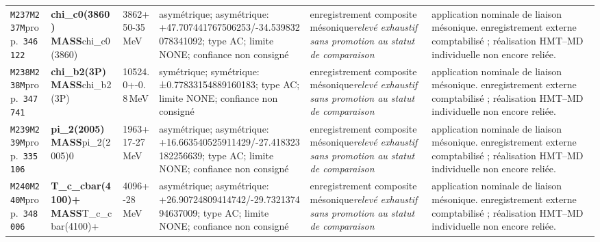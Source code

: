 \begin{landscape}
\begin{longtable}{L{1.85cm}L{4.45cm}L{2.35cm}L{4.05cm}L{3.35cm}L{7.15cm}}
\texttt{M237}\newline \texttt{M237M}\newline prop.\ \texttt{346122} & \textbf{chi\_\allowbreak{}c0(3860) MASS}\newline chi\_\allowbreak{}c0(3860) & 3862+50-35\,MeV & asymétrique; asymétrique: +47.707441767506253/-34.539832078341092; type AC; limite NONE; confiance non consigné & enregistrement composite mésonique\newline \emph{relevé exhaustif sans promotion au statut de comparaison} & application nominale de liaison mésonique. enregistrement externe comptabilisé ; réalisation HMT--MD individuelle non encore reliée. \\
\texttt{M238}\newline \texttt{M238M}\newline prop.\ \texttt{347741} & \textbf{chi\_\allowbreak{}b2(3P) MASS}\newline chi\_\allowbreak{}b2(3P) & 10524.0+-0.8\,MeV & symétrique; symétrique: ±0.77833154889160183; type AC; limite NONE; confiance non consigné & enregistrement composite mésonique\newline \emph{relevé exhaustif sans promotion au statut de comparaison} & application nominale de liaison mésonique. enregistrement externe comptabilisé ; réalisation HMT--MD individuelle non encore reliée. \\
\texttt{M239}\newline \texttt{M239M}\newline prop.\ \texttt{335106} & \textbf{pi\_\allowbreak{}2(2005) MASS}\newline pi\_\allowbreak{}2(2005)0 & 1963+17-27\,MeV & asymétrique; asymétrique: +16.663540525911429/-27.418323182256639; type AC; limite NONE; confiance non consigné & enregistrement composite mésonique\newline \emph{relevé exhaustif sans promotion au statut de comparaison} & application nominale de liaison mésonique. enregistrement externe comptabilisé ; réalisation HMT--MD individuelle non encore reliée. \\
\texttt{M240}\newline \texttt{M240M}\newline prop.\ \texttt{348006} & \textbf{T\_\allowbreak{}c\_\allowbreak{}cbar(4100)+ MASS}\newline T\_\allowbreak{}c\_\allowbreak{}cbar(4100)+ & 4096+-28\,MeV & asymétrique; asymétrique: +26.90724809414742/-29.732137494637009; type AC; limite NONE; confiance non consigné & enregistrement composite mésonique\newline \emph{relevé exhaustif sans promotion au statut de comparaison} & application nominale de liaison mésonique. enregistrement externe comptabilisé ; réalisation HMT--MD individuelle non encore reliée. \\

\end{longtable}
\end{landscape}
